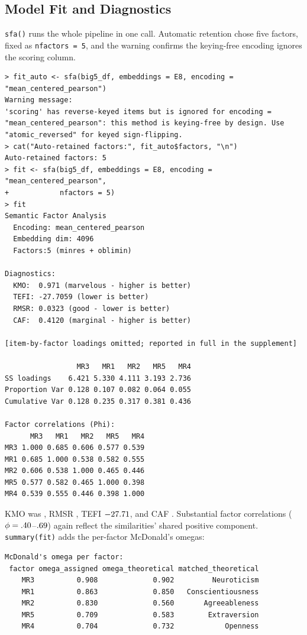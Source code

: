 \subsection{Model Fit and Diagnostics}

\texttt{sfa()} runs the whole pipeline in one call. Automatic retention
chose five factors, fixed as \texttt{nfactors~=~5}, and the warning
confirms the keying-free encoding ignores the scoring column.

{\scriptsize
\begin{verbatim}
> fit_auto <- sfa(big5_df, embeddings = E8, encoding = "mean_centered_pearson")
Warning message:
'scoring' has reverse-keyed items but is ignored for encoding =
"mean_centered_pearson": this method is keying-free by design. Use
"atomic_reversed" for keyed sign-flipping.
> cat("Auto-retained factors:", fit_auto$factors, "\n")
Auto-retained factors: 5
> fit <- sfa(big5_df, embeddings = E8, encoding = "mean_centered_pearson",
+            nfactors = 5)
> fit
Semantic Factor Analysis
  Encoding: mean_centered_pearson
  Embedding dim: 4096
  Factors:5 (minres + oblimin)

Diagnostics:
  KMO:  0.971 (marvelous - higher is better)
  TEFI: -27.7059 (lower is better)
  RMSR: 0.0323 (good - lower is better)
  CAF:  0.4120 (marginal - higher is better)

[item-by-factor loadings omitted; reported in full in the supplement]

                 MR3   MR1   MR2   MR5   MR4
SS loadings    6.421 5.330 4.111 3.193 2.736
Proportion Var 0.128 0.107 0.082 0.064 0.055
Cumulative Var 0.128 0.235 0.317 0.381 0.436

Factor correlations (Phi):
      MR3   MR1   MR2   MR5   MR4
MR3 1.000 0.685 0.606 0.577 0.539
MR1 0.685 1.000 0.538 0.582 0.555
MR2 0.606 0.538 1.000 0.465 0.446
MR5 0.577 0.582 0.465 1.000 0.398
MR4 0.539 0.555 0.446 0.398 1.000
\end{verbatim}
}

KMO was \valKmo, RMSR \valRmsr, TEFI $-27.71$, and CAF \valCaf. Substantial factor
correlations ($\phi = .40$--$.69$) again reflect the similarities'
shared positive component. \texttt{summary(fit)} adds the per-factor
McDonald's omegas:

{\scriptsize
\begin{verbatim}
McDonald's omega per factor:
 factor omega_assigned omega_theoretical matched_theoretical
    MR3          0.908             0.902         Neuroticism
    MR1          0.863             0.850   Conscientiousness
    MR2          0.830             0.560       Agreeableness
    MR5          0.709             0.583        Extraversion
    MR4          0.704             0.732            Openness
\end{verbatim}
}

